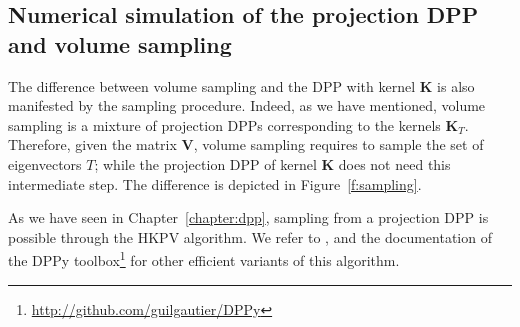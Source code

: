 \documentclass[twoside,11pt]{book}
\numberwithin{theorem}{chapter}
\numberwithin{definition}{chapter}
\numberwithin{proposition}{chapter}
\numberwithin{corollary}{chapter}
\numberwithin{example}{chapter}
\numberwithin{lemma}{chapter}
\numberwithin{assumption}{chapter}
\numberwithin{equation}{chapter}
\numberwithin{figure}{chapter}
\DeclareMathOperator{\Tran}{\intercal}
\begin{document}
\subsection{Numerical simulation of the projection DPP and volume sampling}
\label{subsec:sampling_from_a_dpp}
The difference between volume sampling and the DPP with kernel $\bm K$ is also manifested by the sampling procedure. Indeed, as we have mentioned, volume sampling is a mixture of projection DPPs corresponding to the kernels $\bm{K}_{T}$. Therefore, given the matrix $\bm{V}$, volume sampling requires to sample the set of eigenvectors $T$; while the projection DPP of kernel $\bm{K}$ does not need this intermediate step. The difference is depicted in Figure~\ref{f:sampling}.




As we have seen in Chapter~\ref{chapter:dpp}, sampling from a projection DPP is possible through the HKPV algorithm.
We refer to \citep*{TrBaAm18}, \citep*{DeLaGa20} and the documentation of the DPPy toolbox\footnote{\url{http://github.com/guilgautier/DPPy}} \citep*{GaBaVa18} for other efficient variants of this algorithm.  



\end{document}
